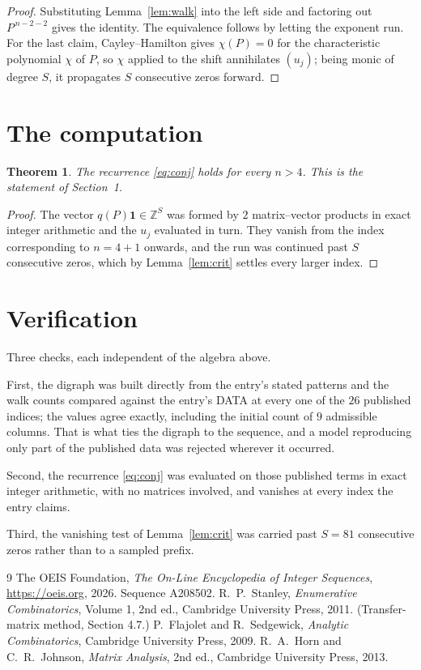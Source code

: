 \documentclass[11pt,a4paper]{article}
\theoremstyle{plain}
\newtheorem{theorem}{Theorem}
\theoremstyle{definition}
\begin{document}
\begin{proof}
Substituting Lemma~\ref{lem:walk} into the left side and factoring out
$P^{\,n-2-2}$ gives the identity. The equivalence follows by letting the exponent
run. For the last claim, Cayley--Hamilton gives $\chi(P)=0$ for the characteristic
polynomial $\chi$ of $P$, so $\chi$ applied to the shift annihilates $(u_j)$; being monic of
degree $S$, it propagates $S$ consecutive zeros forward.
\end{proof}

\section{The computation}

\begin{theorem}
The recurrence \eqref{eq:conj} holds for every $n>4$. This is the statement of
Section~1.
\end{theorem}

\begin{proof}
The vector $q(P)\mathbf{1}\in\mathbb{Z}^{S}$ was formed by $2$ matrix--vector
products in exact integer arithmetic and the $u_j$ evaluated in turn. They vanish from the
index corresponding to $n=4+1$ onwards, and the run was continued past $S$ consecutive
zeros, which by Lemma~\ref{lem:crit} settles every larger index.
\end{proof}

\section{Verification}

Three checks, each independent of the algebra above.

First, the digraph was built directly from the entry's stated patterns and the walk counts
compared against the entry's DATA at every one of the $26$ published indices; the
values agree exactly, including the initial count of $9$ admissible columns. That is
what ties the digraph to the sequence, and a model reproducing only part of the published
data was rejected wherever it occurred.

Second, the recurrence \eqref{eq:conj} was evaluated on those published terms in exact
integer arithmetic, with no matrices involved, and vanishes at every index the entry claims.

Third, the vanishing test of Lemma~\ref{lem:crit} was carried past $S=81$ consecutive
zeros rather than to a sampled prefix.

\begin{thebibliography}{9}
 The OEIS Foundation, \emph{The On-Line Encyclopedia of Integer
Sequences}, \url{https://oeis.org}, 2026. Sequence A208502.
 R.~P.~Stanley, \emph{Enumerative Combinatorics}, Volume 1, 2nd ed.,
Cambridge University Press, 2011. (Transfer-matrix method, Section 4.7.)
 P.~Flajolet and R.~Sedgewick, \emph{Analytic Combinatorics}, Cambridge
University Press, 2009.
 R.~A.~Horn and C.~R.~Johnson, \emph{Matrix Analysis}, 2nd ed., Cambridge
University Press, 2013.
\end{thebibliography}
\end{document}
